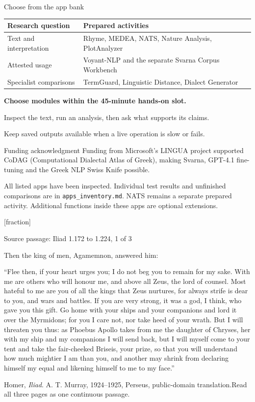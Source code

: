 \documentclass[aspectratio=169,10pt]{beamer}
\newcommand{\key}[1]{\textcolor{aegean}{\textbf{#1}}}
\newcommand{\source}[1]{\vfill{\scriptsize\color{slate}#1\par}}
\newcommand{\question}[1]{\medskip\par\key{#1}\par}
\begin{document}
\begin{frame}{Choose from the app bank}
  \small
  \begin{tabularx}{\textwidth}{@{}lX@{}}
    \toprule
    \textbf{Research question} & \textbf{Prepared activities}\\
    \midrule
    Text and interpretation & Rhyme, MEDEA, NATS, Nature Analysis, PlotAnalyzer\\[2pt]
    Attested usage & Voyant-NLP and the separate Svarna Corpus Workbench\\[2pt]
    Specialist comparisons & TermGuard, Linguistic Distance, Dialect Generator\\
    \bottomrule
  \end{tabularx}
  \question{Choose modules within the 45-minute hands-on slot.}
  Inspect the text, run an analysis, then ask what supports its claims.\par
  Keep saved outputs available when a live operation is slow or fails.
  \begin{block}{Funding acknowledgment}
    \footnotesize Funding from Microsoft's LINGUA project supported CoDAG (Computational Dialectal Atlas of Greek), making Svarna, GPT-4.1 fine-tuning and the Greek NLP Swiss Knife possible.
  \end{block}
  \source{All listed apps have been inspected. Individual test results and unfinished comparisons are in \texttt{apps\_inventory.md}.\newline
  NATS remains a separate prepared activity. Additional functions inside these apps are optional extensions.}
\end{frame}

\appendix
{}[fraction]
\begin{frame}{Source passage: Iliad 1.172 to 1.224, 1 of 3}
\small\raggedright\setlength{\parskip}{3pt}
Then the king of men, Agamemnon, answered him:

“Flee then, if your heart urges you; I do not beg you to remain for my sake. With me are others who will honour me, and above all Zeus, the lord of counsel. Most hateful to me are you of all the kings that Zeus nurtures, for always strife is dear to you, and wars and battles. If you are very strong, it was a god, I think, who gave you this gift. Go home with your ships and your companions and lord it over the Myrmidons; for you I care not, nor take heed of your wrath. But I will threaten you thus: as Phoebus Apollo takes from me the daughter of Chryses, her with my ship and my companions I will send back, but I will myself come to your tent and take the fair-cheeked Briseis, your prize, so that you will understand how much mightier I am than you, and another may shrink from declaring himself my equal and likening himself to me to my face.”
\source{Homer, \emph{Iliad}. A. T. Murray, 1924--1925, Perseus, public-domain translation.\newline Read all three pages as one continuous passage.}
\end{frame}
\end{document}
